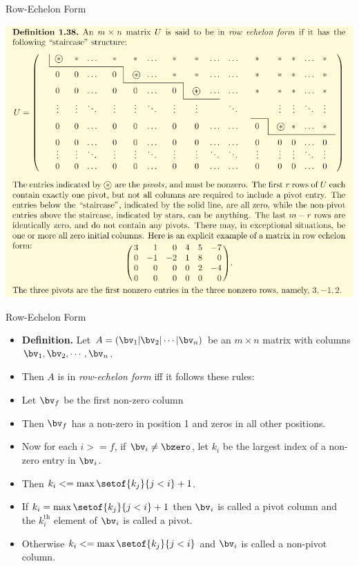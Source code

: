 \documentclass{beamer}
\begin{document}

\begin{frame}{Row-Echelon Form}

\begin{center}
\includegraphics[scale=0.25]{row-echelon-form}
\end{center}

\end{frame}


\begin{frame}{Row-Echelon Form}

\begin{itemize}
\item \textbf{Definition.} Let $A = \left(\bv_1 \vert \bv_2 \vert \cdots \vert \bv_n\right)$
be an $m\times n$ matrix with columns $\bv_1,\bv_2,\cdots,\bv_n$.
\item Then $A$ is in \emph{row-echelon form} iff it follows these rules:
\item Let $\bv_f$ be the first non-zero column
\item Then $\bv_f$ has a non-zero in position 1 and zeros
in all other positions.
\item Now for each $i>=f$, if $\bv_i\not=\bzero$, let $k_i$ be the largest index of a non-zero entry in $\bv_i$.
\item Then $k_i<=\max \setof{k_j}{j<i} +1$.
\item If $k_i=\max \setof{k_j}{j<i} +1$ then $\bv_i$ is called a pivot column and the $k_i^{\text{th}}$ element
of $\bv_i$ is called a pivot.
\item Otherwise $k_i<= \max \setof{k_j}{j<i}$ and $\bv_i$ is called a non-pivot column.

\end{itemize}

\end{frame}
\end{document}
